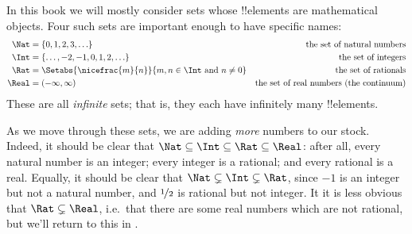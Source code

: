 \documentclass[../../../include/open-logic-section]{subfiles}
\begin{document}
	

In this book we will mostly consider sets whose !!{element}s are mathematical objects. Four such sets are important enough to have specific names:
	\begin{align*}
		\Nat &= \{0, 1, 2, 3, \ldots\} &\text{the set of natural numbers}\\
		\Int &= \{\ldots, -2, -1, 0, 1, 2, \ldots\} & \text{the set of integers}\\
		\Rat &= \Setabs{\nicefrac{m}{n}}{m, n \in \Int\text{ and }n \neq 0}&\text{the set of rationals}\\
		\Real &= (-\infty, \infty)& \text{the set of real numbers (the continuum)}
\end{align*}
These are all \emph{infinite} sets; that is, they each have infinitely many !!{element}s. 

As we move through these sets, we are adding \emph{more} numbers to our stock. Indeed, it should be clear that $\Nat \subseteq \Int \subseteq \Rat \subseteq \Real$: after all, every natural number is an integer; every integer is a rational; and every rational is a real. Equally, it should be clear that $\Nat \subsetneq \Int \subsetneq \Rat$, since $-1$ is an integer but not a natural number, and $\nicefrac{1}{2}$ is rational but not integer. It it is less obvious that $\Rat \subsetneq \Real$, i.e.\ that there are some real numbers which are not rational, but we'll return to this in . 
\end{document}
